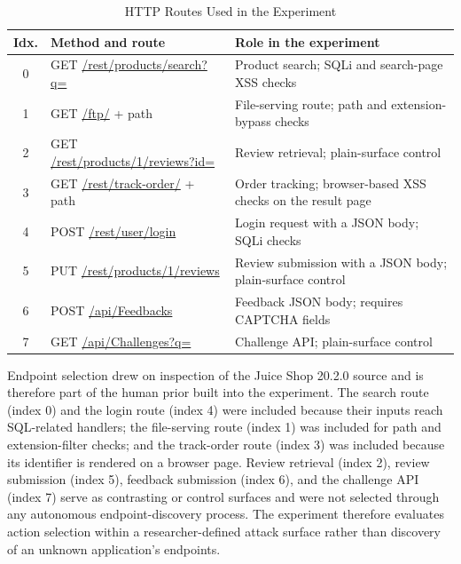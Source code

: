 \documentclass[conference, a4paper]{IEEEtran}
\begin{document}
\begin{table}[!t]
\caption{HTTP Routes Used in the Experiment}
\label{tab:api-endpoints}
\centering
\footnotesize
\setlength{\tabcolsep}{3pt}
\begin{tabular}{c p{} p{}}
\toprule
\textbf{Idx.} & \textbf{Method and route} & \textbf{Role in the experiment}\\
\midrule
0 & GET \url{/rest/products/search?q=} & Product search; SQLi and search-page XSS checks\\
1 & GET \url{/ftp/} + path & File-serving route; path and extension-bypass checks\\
2 & GET \url{/rest/products/1/reviews?id=} & Review retrieval; plain-surface control\\
3 & GET \url{/rest/track-order/} + path & Order tracking; browser-based XSS checks on the result page\\
4 & POST \url{/rest/user/login} & Login request with a JSON body; SQLi checks\\
5 & PUT \url{/rest/products/1/reviews} & Review submission with a JSON body; plain-surface control\\
6 & POST \url{/api/Feedbacks} & Feedback JSON body; requires CAPTCHA fields\\
7 & GET \url{/api/Challenges?q=} & Challenge API; plain-surface control\\
\bottomrule
\end{tabular}
\end{table}
\setlength{\tabcolsep}{6pt}

Endpoint selection drew on inspection of the Juice Shop 20.2.0
source and is therefore part of the human prior built into the
experiment. The search route (index 0) and the login route
(index 4) were included because their inputs reach SQL-related
handlers; the file-serving route (index 1) was included for path
and extension-filter checks; and the track-order route (index 3)
was included because its identifier is rendered on a browser page.
Review retrieval (index 2), review submission (index 5), feedback
submission (index 6), and the challenge API (index 7) serve as
contrasting or control surfaces and were not selected through any
autonomous endpoint-discovery process. The experiment therefore
evaluates action selection within a researcher-defined attack
surface rather than discovery of an unknown application's
endpoints.
\end{document}
